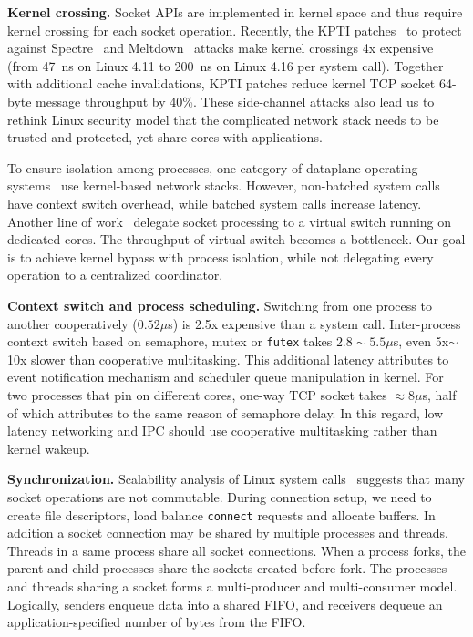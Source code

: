 \textbf{Kernel crossing.}
Socket APIs are implemented in kernel space and thus require kernel crossing for each socket operation. Recently, the KPTI patches~\cite{kpti} to protect against Spectre~\cite{Kocher2018spectre} and Meltdown~\cite{Lipp2018meltdown} attacks make kernel crossings 4x expensive (from 47~ns on Linux 4.11 to 200~ns on Linux 4.16 per system call). Together with additional cache invalidations, KPTI patches reduce kernel TCP socket 64-byte message throughput by 40\%. These side-channel attacks also lead us to rethink Linux security model that the complicated network stack needs to be trusted and protected, yet share cores with applications.

To ensure isolation among processes, one category of dataplane operating systems~\cite{belay2017ix,tsai2017lite} use kernel-based network stacks. However, non-batched system calls have context switch overhead, while batched system calls increase latency. Another line of work~\cite{martins2014clickos,roghanchi2017ffwd,huang2017high} delegate socket processing to a virtual switch running on dedicated cores. The throughput of virtual switch becomes a bottleneck. Our goal is to achieve kernel bypass with process isolation, while not delegating every operation to a centralized coordinator.

\textbf{Context switch and process scheduling.}
Switching from one process to another cooperatively ($0.52\mu$s) is 2.5x expensive than a system call. Inter-process context switch based on semaphore, mutex or \texttt{futex} takes $2.8\sim5.5\mu$s, even 5x$\sim$10x slower than cooperative multitasking. This additional latency attributes to event notification mechanism and scheduler queue manipulation in kernel. For two processes that pin on different cores, one-way TCP socket takes $\approx8\mu$s, half of which attributes to the same reason of semaphore delay. In this regard, low latency networking and IPC should use cooperative multitasking rather than kernel wakeup.

\textbf{Synchronization.}
Scalability analysis of Linux system calls~\cite{boyd2010analysis} suggests that many socket operations are not commutable. During connection setup, we need to create file descriptors, load balance \texttt{connect} requests and allocate buffers. In addition a socket connection may be shared by multiple processes and threads. Threads in a same process share all socket connections. When a process forks, the parent and child processes share the sockets created before fork. The processes and threads sharing a socket forms a multi-producer and multi-consumer model. Logically, senders enqueue data into a shared FIFO, and receivers dequeue an application-specified number of bytes from the FIFO.


